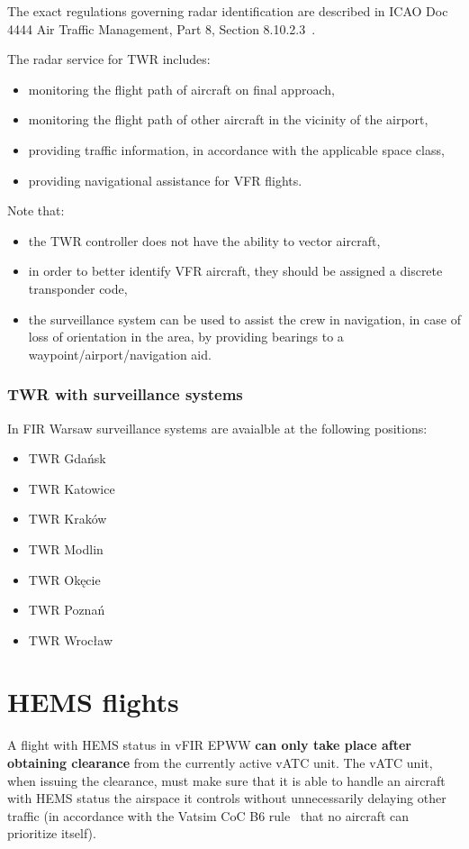 The exact regulations governing radar identification are described in ICAO Doc 4444 Air Traffic Management, Part 8, Section 8.10.2.3~\cite{4444}.

The radar service for TWR includes:
\begin{itemize}
	\item monitoring the flight path of aircraft on final approach,
	\item monitoring the flight path of other aircraft in the vicinity of the airport,
	\item providing traffic information, in accordance with the applicable space class,
	\item providing navigational assistance for VFR flights.
\end{itemize}

Note that:
\begin{itemize}
	\item the TWR controller does not have the ability to vector aircraft,
	\item in order to better identify VFR aircraft, they should be assigned a discrete transponder code,
	\item the surveillance system can be used to assist the crew in navigation, in case of loss of orientation in the area, by providing bearings to a waypoint/airport/navigation aid.
\end{itemize}

\subsubsection{TWR with surveillance systems}
In FIR Warsaw surveillance systems are avaialble at the following positions:
\begin{itemize}
	\item TWR Gdańsk
	\item TWR Katowice
	\item TWR Kraków
	\item TWR Modlin
	\item TWR Okęcie
	\item TWR Poznań
	\item TWR Wrocław
\end{itemize}

\section{HEMS flights}\label{sect:twr:hems}
A flight with HEMS status in vFIR EPWW \textbf{can only take place after obtaining clearance} from the currently active vATC unit. The vATC unit, when issuing the clearance, must make sure that it is able to handle an aircraft with HEMS status the airspace it controls without unnecessarily delaying other traffic (in accordance with the Vatsim CoC B6 rule~\cite{coc} that no aircraft can prioritize itself).

